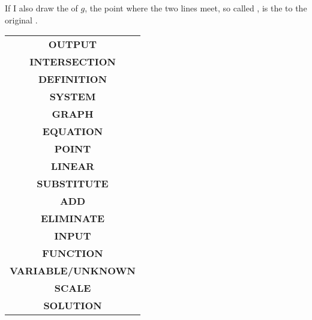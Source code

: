 \documentclass[a4paper,11pt]{article}
\begin{document}
\begin{paracol}{2}
 If I also draw the \underline{\hspace{10ex}} of $g$, the point where the two
 lines meet, so called \underline{\hspace{24ex}}, is the
 \underline{\hspace{16ex}} to the original \underline{\hspace{12ex}}.
 
 \switchcolumn
 \renewcommand{\arraystretch}{2}
 \begin{tabular}{c}
  \textbf{OUTPUT}\\
  \textbf{INTERSECTION}\\
  \textbf{DEFINITION}\\
  \textbf{SYSTEM}\\
  \textbf{GRAPH}\\
  \textbf{EQUATION}\\
  \textbf{POINT}\\
  \textbf{LINEAR}\\
  \textbf{SUBSTITUTE}\\
  \textbf{ADD}\\
  \textbf{ELIMINATE}\\
  \textbf{INPUT}\\
  \textbf{FUNCTION}\\
  \textbf{VARIABLE/UNKNOWN}\\
  \textbf{SCALE}\\
  \textbf{SOLUTION}
 \end{tabular}
\end{paracol}
\end{document}
